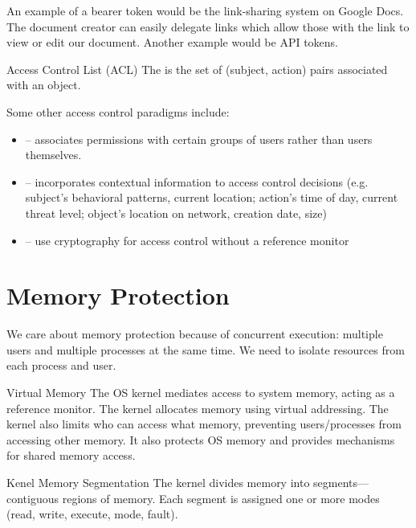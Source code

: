 \documentclass[code]{amznotes}
\begin{document}
An example of a bearer token would be the link-sharing system on Google Docs. The document creator can easily delegate links which allow those with the link to view or edit our document. Another example would be API tokens.

\begin{dfnbox}{Access Control List (ACL)}{}
    The  is the set of (subject, action) pairs associated with an object.
\end{dfnbox}

Some other access control paradigms include:
\begin{itemize}
    \item {} -- associates permissions with certain groups of users rather than users themselves.
    \item {} -- incorporates contextual information to access control decisions (e.g. subject's behavioral patterns, current location; action's time of day, current threat level; object's location on network, creation date, size)
    \item {} -- use cryptography for access control without a reference monitor
\end{itemize}

\section{Memory Protection}
We care about memory protection because of concurrent execution: multiple users and multiple processes at the same time. We need to isolate resources from each process and user.

\begin{dfnbox}{Virtual Memory}{}
The OS kernel mediates access to system memory, acting as a reference monitor. The kernel allocates memory using virtual addressing. The kernel also limits who can access what memory, preventing users/processes from accessing other memory. It also protects OS memory and provides mechanisms for shared memory access.
\end{dfnbox}

\begin{dfnbox}{Kenel Memory Segmentation}{}
    The kernel divides memory into segments---contiguous regions of memory. Each segment is assigned one or more modes (read, write, execute, mode, fault).
\end{dfnbox}
\end{document}
